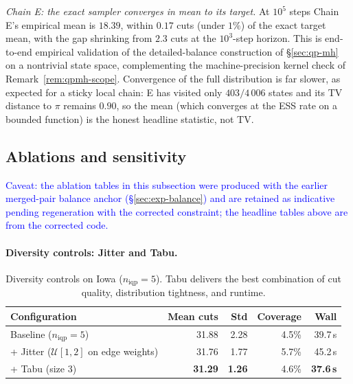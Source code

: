 \documentclass[11pt]{article}
\newcommand{\draft}[1]{\textcolor{blue}{#1}}
\begin{document}
\emph{Chain E: the exact sampler converges in mean to its target.} At
$10^5$ steps Chain E's empirical mean is $18.39$, within $0.17$ cuts
(under $1\%$) of the exact target mean, with the gap shrinking from
$2.3$ cuts at the $10^3$-step horizon. This is end-to-end empirical
validation of the detailed-balance construction of \S\ref{sec:qp-mh}
on a nontrivial state space, complementing the machine-precision
kernel check of Remark~\ref{rem:qpmh-scope}. Convergence of the full
distribution is far slower, as expected for a sticky local chain: E
has visited only $403/4\,006$ states and its TV distance to $\pi$
remains $0.90$, so the mean (which converges at the ESS rate on a
bounded function) is the honest headline statistic, not TV.

\subsection{Ablations and sensitivity}\label{sec:exp-ablations}

\draft{Caveat: the ablation tables in this subsection were produced
with the earlier merged-pair balance anchor
(\S\ref{sec:exp-balance}) and are retained as indicative pending
regeneration with the corrected constraint; the headline tables above
are from the corrected code.}

\paragraph{Diversity controls: Jitter and Tabu.}\label{sec:exp-diversity}

\begin{table}[H]
\centering
\small
\begin{tabular}{lrrrr}
\toprule
Configuration & Mean cuts & Std & Coverage & Wall \\
\midrule
Baseline ($n_{\mathrm{iqp}} = 5$)               & 31.88 & 2.28 & 4.5\% & 39.7\,s \\
+ Jitter ($\mathcal{U}[1,2]$ on edge weights)   & 31.76 & 1.77 & 5.7\% & 45.2\,s \\
+ Tabu (size 3)                                  & \textbf{31.29} & \textbf{1.26} & 4.6\% & \textbf{37.6\,s} \\
\bottomrule
\end{tabular}
\caption{Diversity controls on Iowa ($n_{\mathrm{iqp}} = 5$). Tabu
  delivers the best combination of cut quality, distribution
  tightness, and runtime.}\label{tab:diversity-iowa}
\end{table}
\end{document}
